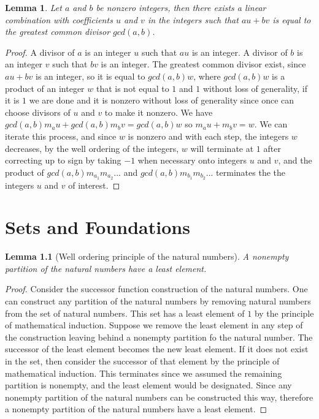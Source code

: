 \documentclass{tufte-book}
\newtheorem{lemma}[theorem]{Lemma}
\begin{document}
\begin{lemma}
  Let $a$ and $b$ be nonzero integers, then there exists a linear combination with coefficients $u$ and $v$ in the integers such that
  $au + bv$ is equal to the greatest common divisor $gcd(a,b)$.
\end{lemma}

\begin{proof}
  A divisor of $a$ is an integer $u$ such that $au$ is an integer.
  A divisor of $b$ is an integer $v$ such that $bv$ is an integer.
  The greatest common divisor exist, since $au + bv$ is an integer, so it is equal to $gcd(a,b)w$, where $gcd(a,b)w$ is 
  a product of an integer $w$ that is not equal to $1$ and $1$ without loss of generality, if it is $1$ we are done and it is
  nonzero without loss of generality since once can choose divisors of $u$ and $v$ to make it nonzero.
  We have $gcd(a,b) m_a u + gcd(a,b) m_b v = gcd(a,b) w$ so $m_a u + m_b v = w$. We can iterate this process, and since $w$ is nonzero and with each step, the integers $w$ decreases, by the well ordering of the integers, $w$ will terminate at $1$ after correcting up to sign by taking $-1$ when necessary onto integers $u$ and $v$, and the product of $gcd(a,b) m_{a_1} m_{a_2}...$ and $gcd(a,b) m_{b_1} m_{b_2}...$ terminates the the integers $u$ and $v$ of interest.
\end{proof}

\chapter{Sets and Foundations}

\begin{lemma}[Well ordering principle of the natural numbers]
  A nonempty partition of the natural numbers have a least element.
\end{lemma}

\begin{proof}
  Consider the successor function construction of the natural numbers.
  One can construct any partition of the natural numbers by removing natural numbers from the set of natural numbers.
  This set has a least element of $1$ by the principle of mathematical induction.
  Suppose we remove the least element in any step of the construction leaving behind a nonempty partition fo the natural number. 
  The successor of the least element becomes the new least element. If it does not exist in the set, then consider the successor of that element by the principle of mathematical induction. This terminates since we assumed the remaining partition is nonempty, and the least element would be designated. Since any nonempty partition of the natural numbers can be constructed this way, therefore a nonempty partition of the natural numbers have a least element.
\end{proof}
\end{document}
